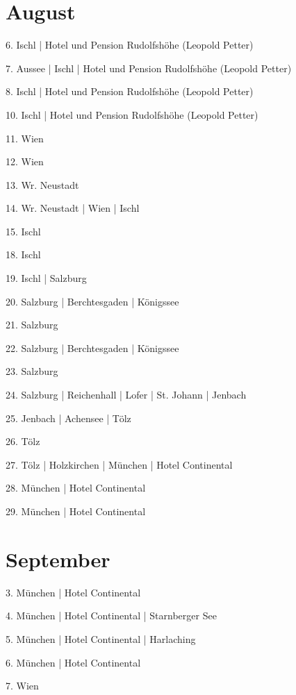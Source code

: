 \documentclass[twoside=false,titlepage=false,open=any, parskip=never, fontsize=10pt, headings=small, chapterprefix=false, appendixprefix=false, DIV=15]{scrbook}
\begin{document}
\begin{multicols}{3}
            \section*{August}
            6. Ischl | Hotel und Pension Rudolfshöhe (Leopold Petter)\par
            7. Aussee | Ischl | Hotel und Pension Rudolfshöhe (Leopold Petter)\par
            8. Ischl | Hotel und Pension Rudolfshöhe (Leopold Petter)\par
            10. Ischl | Hotel und Pension Rudolfshöhe (Leopold Petter)\par
            11. Wien\par
            12. Wien\par
            13. Wr. Neustadt\par
            14. Wr. Neustadt | Wien | Ischl\par
            15. Ischl\par
            18. Ischl\par
            19. Ischl | Salzburg\par
            20. Salzburg | Berchtesgaden | Königssee\par
            21. Salzburg\par
            22. Salzburg | Berchtesgaden | Königssee\par
            23. Salzburg\par
            24. Salzburg | Reichenhall | Lofer | St. Johann | Jenbach\par
            25. Jenbach | Achensee | Tölz\par
            26. Tölz\par
            27. Tölz | Holzkirchen | München | Hotel Continental\par
            28. München | Hotel Continental\par
            29. München | Hotel Continental\par
            \section*{September}
            3. München | Hotel Continental\par
            4. München | Hotel Continental | Starnberger See\par
            5. München | Hotel Continental | Harlaching\par
            6. München | Hotel Continental\par
            7. Wien\par

\end{multicols}
\end{document}
